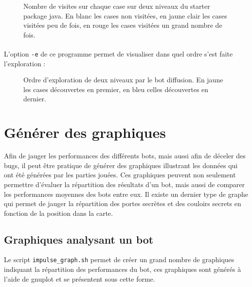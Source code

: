 \documentclass[10pt,a4paper]{report}
\begin{document}
\begin{figure}[h]
	\caption{Nombre de visites sur chaque case sur deux niveaux du starter package java. En blanc les cases non visitées, en jaune clair les cases visitées peu de fois, en rouge les cases visitées un grand nombre de fois.}
	\resizebox{\columnwidth}{!}{}
\end{figure}

\paragraph{} L'option \verb!-e! de ce programme permet de visualiser dans quel
ordre s'est faite l'exploration :

\begin{figure}[H]
	\caption{Ordre d'exploration de deux niveaux par le bot diffusion. En
	jaune les cases découvertes en premier, en bleu celles découvertes en
dernier.}
	\resizebox{\columnwidth}{!}{}
\end{figure}


\section{Générer des graphiques}
Afin de jauger les performances des différents bots, mais aussi afin de
déceler des bugs, il peut être pratique de générer des graphiques illustrant les
données qui ont été générées par les parties jouées. Ces graphiques peuvent
non seulement permettre d'évaluer la répartition des résultats d'un bot,
mais aussi de comparer les performances moyennes des bots entre eux. Il existe
un dernier type de graphe qui permet de jauger la répartition des portes
secrètes et des couloirs secrets en fonction de la position dans la carte.



\subsection{Graphiques analysant un bot}
Le script \verb!impulse_graph.sh! permet de créer un grand nombre de
graphiques indiquant la répartition des performances du bot, ces graphiques
sont générés à l'aide de gnuplot et se présentent sous cette forme.
\end{document}
